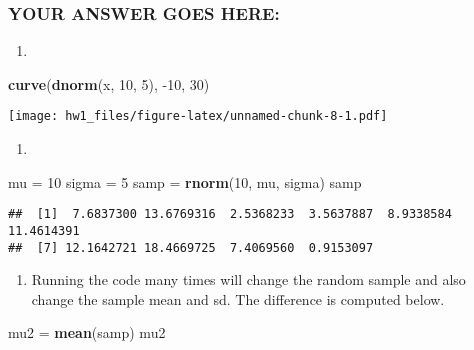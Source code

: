 \documentclass[
]{article}
\newenvironment{Shaded}{\begin{snugshade}}{\end{snugshade}}
\newcommand{\DecValTok}[1]{\textcolor[rgb]{0.00,0.00,0.81}{#1}}
\newcommand{\KeywordTok}[1]{\textcolor[rgb]{0.13,0.29,0.53}{\textbf{#1}}}
\newcommand{\NormalTok}[1]{#1}
\newcommand{\StringTok}[1]{\textcolor[rgb]{0.31,0.60,0.02}{#1}}
\providecommand{\tightlist}{%
  \setlength{\itemsep}{0pt}\setlength{\parskip}{0pt}}
\begin{document}
\hypertarget{your-answer-goes-here-1}{%
\subsubsection{YOUR ANSWER GOES HERE:}\label{your-answer-goes-here-1}}

\begin{enumerate}
\def\labelenumi{\arabic{enumi}.}
\tightlist
\item
\end{enumerate}

\begin{Shaded}
\begin{Highlighting}[]
\KeywordTok{curve}\NormalTok{(}\KeywordTok{dnorm}\NormalTok{(x, }\DecValTok{10}\NormalTok{, }\DecValTok{5}\NormalTok{), }\DecValTok{{-}10}\NormalTok{, }\DecValTok{30}\NormalTok{)}
\end{Highlighting}
\end{Shaded}

\texttt{[image: hw1\_files/figure-latex/unnamed-chunk-8-1.pdf]}

\begin{enumerate}
\def\labelenumi{\arabic{enumi}.}
\setcounter{enumi}{1}
\tightlist
\item
\end{enumerate}

\begin{Shaded}
\begin{Highlighting}[]
\NormalTok{mu =}\StringTok{ }\DecValTok{10}
\NormalTok{sigma =}\StringTok{ }\DecValTok{5}
\NormalTok{samp =}\StringTok{ }\KeywordTok{rnorm}\NormalTok{(}\DecValTok{10}\NormalTok{, mu, sigma)}
\NormalTok{samp}
\end{Highlighting}
\end{Shaded}

\begin{verbatim}
##  [1]  7.6837300 13.6769316  2.5368233  3.5637887  8.9338584 11.4614391
##  [7] 12.1642721 18.4669725  7.4069560  0.9153097
\end{verbatim}

\begin{enumerate}
\def\labelenumi{\arabic{enumi}.}
\setcounter{enumi}{2}
\tightlist
\item
  Running the code many times will change the random sample and also
  change the sample mean and sd. The difference is computed below.
\end{enumerate}

\begin{Shaded}
\begin{Highlighting}[]
\NormalTok{mu2 =}\StringTok{ }\KeywordTok{mean}\NormalTok{(samp)}
\NormalTok{mu2}
\end{Highlighting}
\end{Shaded}
\end{document}
